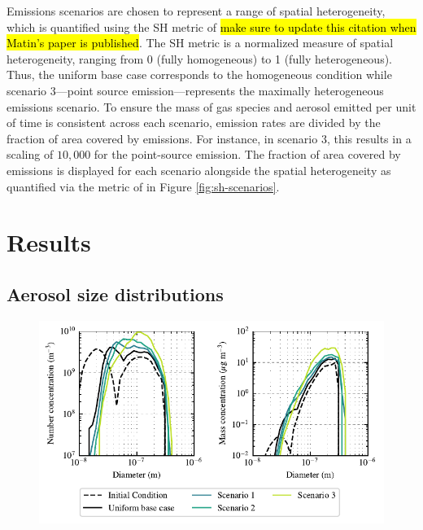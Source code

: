 \documentclass[journal abbreviation, manuscript]{copernicus}
\begin{document}
Emissions scenarios are chosen to represent a range of spatial heterogeneity, which is quantified using the SH metric of \citep{mohebalhojeh_2024} \hl{make sure to update this citation when Matin's paper is published}. The SH metric is a normalized measure of spatial heterogeneity, ranging from 0 (fully homogeneous) to 1 (fully heterogeneous). Thus, the uniform base case corresponds to the homogeneous condition while scenario 3---point source emission---represents the maximally heterogeneous emissions scenario. To ensure the mass of gas species and aerosol emitted per unit of time is consistent across each scenario, emission rates are divided by the fraction of area covered by emissions. For instance, in scenario 3, this results in a scaling of $10,000$ for the point-source emission. The fraction of area covered by emissions is displayed for each scenario alongside the spatial heterogeneity as quantified via the metric of \citet{mohebalhojeh_2024} in Figure \ref{fig:sh-scenarios}.

\section{Results}

\subsection{Aerosol size distributions}

\begin{figure}[!h]
	\centering
	\includegraphics[]{figures/combined_num_mass_conc_i50_j50_k60.pdf}
	\caption{}
	\label{fig:size-dists}
\end{figure} 
\end{document}
